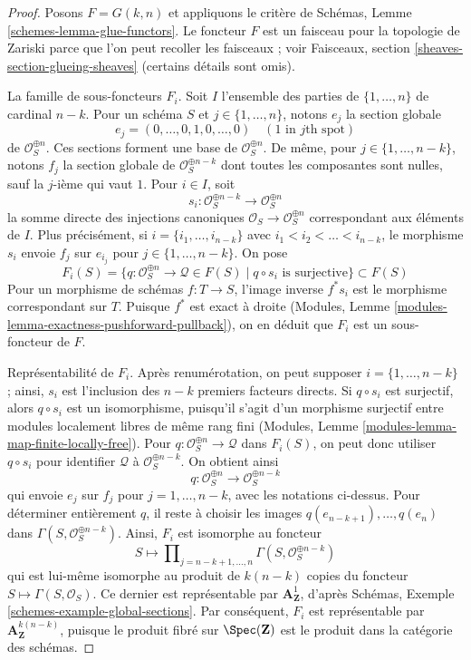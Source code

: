 \begin{proof}
Posons $F = G(k, n)$ et appliquons le critère de Schémas,
Lemme \ref{schemes-lemma-glue-functors}.
Le foncteur $F$ est un faisceau pour la topologie de Zariski parce que
l'on peut recoller les faisceaux ; voir Faisceaux,
section \ref{sheaves-section-glueing-sheaves} (certains détails sont omis).

\medskip\noindent
La famille de sous-foncteurs $F_i$.
Soit $I$ l'ensemble des parties de
$\{1, \ldots, n\}$ de cardinal $n - k$.
Pour un schéma $S$ et $j \in \{1, \ldots, n\}$, notons $e_j$ la section
globale
$$
e_j = (0, \ldots, 0, 1, 0, \ldots, 0)\quad(1\text{ in }j\text{th spot})
$$
de $\mathcal{O}_S^{\oplus n}$. Ces sections forment une base de
$\mathcal{O}_S^{\oplus n}$. De même, pour $j \in \{1, \ldots, n - k\}$,
notons $f_j$ la section globale de $\mathcal{O}_S^{\oplus n - k}$ dont
toutes les composantes sont nulles, sauf la $j$-ième qui vaut $1$.
Pour $i \in I$, soit
$$
s_i : \mathcal{O}_S^{\oplus n - k} \longrightarrow \mathcal{O}_S^{\oplus n}
$$
la somme directe des injections canoniques
$\mathcal{O}_S \to \mathcal{O}_S^{\oplus n}$ correspondant aux éléments
de $I$. Plus précisément, si $i = \{i_1, \ldots, i_{n - k}\}$ avec
$i_1 < i_2 < \ldots < i_{n - k}$, le morphisme $s_i$ envoie $f_j$ sur
$e_{i_j}$ pour $j \in \{1, \ldots, n - k\}$. On pose
$$
F_i(S) = \{q : \mathcal{O}_S^{\oplus n} \to \mathcal{Q} \in F(S) \mid
q \circ s_i \text{ is surjective}\}
\subset F(S)
$$
Pour un morphisme de schémas $f : T \to S$, l'image inverse $f^*s_i$ est
le morphisme correspondant sur $T$. Puisque $f^*$ est exact à droite
(Modules, Lemme \ref{modules-lemma-exactness-pushforward-pullback}),
on en déduit que $F_i$ est un sous-foncteur de $F$.

\medskip\noindent
Représentabilité de $F_i$. Après renumérotation, on peut supposer
$i = \{1, \ldots, n - k\}$ ; ainsi, $s_i$ est l'inclusion des
$n - k$ premiers facteurs directs. Si $q \circ s_i$ est surjectif, alors $q \circ s_i$ est
un isomorphisme, puisqu'il s'agit d'un morphisme surjectif entre modules
localement libres de même rang fini (Modules,
Lemme \ref{modules-lemma-map-finite-locally-free}).
Pour $q : \mathcal{O}_S^{\oplus n} \to \mathcal{Q}$ dans $F_i(S)$,
on peut donc utiliser $q \circ s_i$ pour identifier $\mathcal{Q}$ à
$\mathcal{O}_S^{\oplus n - k}$. On obtient ainsi
$$
q : \mathcal{O}_S^{\oplus n} \longrightarrow \mathcal{O}_S^{\oplus n - k}
$$
qui envoie $e_j$ sur $f_j$ pour $j = 1, \ldots, n - k$, avec les notations
ci-dessus. Pour déterminer entièrement $q$, il reste à choisir les images
$q(e_{n - k + 1}), \ldots, q(e_n)$ dans
$\Gamma(S, \mathcal{O}_S^{\oplus n - k})$.
Ainsi, $F_i$ est isomorphe au foncteur
$$
S \longmapsto
\prod\nolimits_{j = n - k + 1, \ldots, n}
\Gamma(S,  \mathcal{O}_S^{\oplus n - k})
$$
qui est lui-même isomorphe au produit de $k(n - k)$ copies du foncteur
$S \mapsto \Gamma(S, \mathcal{O}_S)$. Ce dernier est représentable par
$\mathbf{A}^1_\mathbf{Z}$, d'après Schémas,
Exemple \ref{schemes-example-global-sections}. Par conséquent, $F_i$ est
représentable par $\mathbf{A}^{k(n - k)}_\mathbf{Z}$, puisque le produit
fibré sur $\Spec(\mathbf{Z})$ est le produit dans la catégorie des schémas.


\end{proof}
